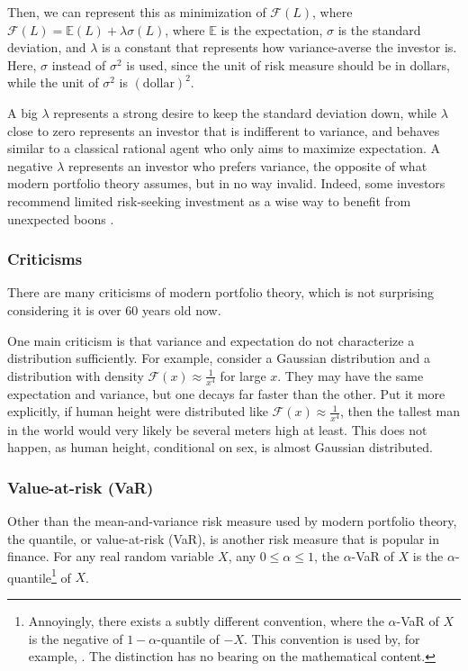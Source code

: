 Then, we can represent this as minimization of $\mathcal{F}(L)$, where $\mathcal{F}(L) = \mathbb{E}(L) + \lambda \sigma(L)$, where $\mathbb{E}$ is the expectation, $\sigma$ is the standard deviation, and $\lambda$ is a constant that represents how variance-averse the investor is. Here, $\sigma$ instead of $\sigma^2$ is used, since the unit of risk measure should be in dollars, while the unit of $\sigma^2$ is $(\text{dollar})^2$.

A big $\lambda$ represents a strong desire to keep the standard deviation down, while $\lambda$ close to zero represents an investor that is indifferent to variance, and behaves similar to a classical rational agent who only aims to maximize expectation. A negative $\lambda$ represents an investor who prefers variance, the opposite of what modern portfolio theory assumes, but in no way invalid. Indeed, some investors recommend limited risk-seeking investment as a wise way to benefit from unexpected boons \cite{talebAntifragileThingsThat2012}.

\subsubsection{Criticisms}
There are many criticisms of modern portfolio theory, which is not surprising considering it is over 60 years old now. 

One main criticism is that variance and expectation do not characterize a distribution sufficiently. For example, consider a Gaussian distribution and a distribution with density $\mathcal{F}(x) \approx \frac{1}{x^4}$ for large $x$. They may have the same expectation and variance, but one decays far faster than the other. Put it more explicitly, if human height were distributed like $\mathcal{F}(x) \approx \frac{1}{x^4}$, then the tallest man in the world would very likely be several meters high at least. This does not happen, as human height, conditional on sex, is almost Gaussian distributed.

\subsubsection{Value-at-risk (VaR)}
Other than the mean-and-variance risk measure used by modern portfolio theory, the quantile, or value-at-risk (VaR), is another risk measure that is popular in finance. For any real random variable $X$, any $0 \le \alpha\le 1$, the $\alpha$-VaR of $X$ is the $\alpha$-quantile\footnote{Annoyingly, there exists a subtly different convention, where the $\alpha$-VaR of $X$ is the negative of $1-\alpha$-quantile of $-X$. This convention is used by, for example, \cite{artznerCoherentMeasuresRisk1999}. The distinction has no bearing on the mathematical content.} of $X$. 

